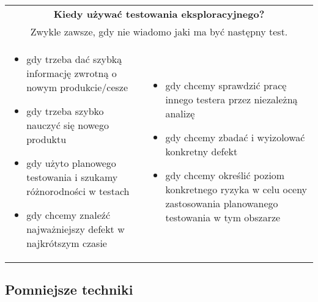 \documentclass[../main.tex]{subfiles}
\begin{document}
    \begin{table}[H]
        \begin{center}
            \begin{tabular}{p{8cm} p{8cm}}
                \multicolumn{2}{c}{\textbf{Kiedy używać testowania eksploracyjnego?}}\\
                \multicolumn{2}{c}{Zwykle zawsze, gdy nie wiadomo jaki ma być następny test.}\\
                \begin{itemize}
                    \item gdy trzeba dać szybką informację zwrotną o nowym produkcie/cesze
                    \item gdy trzeba szybko nauczyć się nowego produktu
                    \item gdy użyto planowego testowania i szukamy różnorodności w testach
                    \item gdy chcemy znaleźć najważniejszy defekt w najkrótszym czasie
                \end{itemize}
                &
                \begin{itemize}
                    \item gdy chcemy sprawdzić pracę innego testera przez niezależną analizę
                    \item gdy chcemy zbadać i wyizolować konkretny defekt
                    \item gdy chcemy określić poziom konkretnego ryzyka w celu oceny zastosowania planowanego testowania w tym obszarze
                \end{itemize}
            \end{tabular}
        \end{center}
    \end{table}

    \subsection{Pomniejsze techniki}
\end{document}

